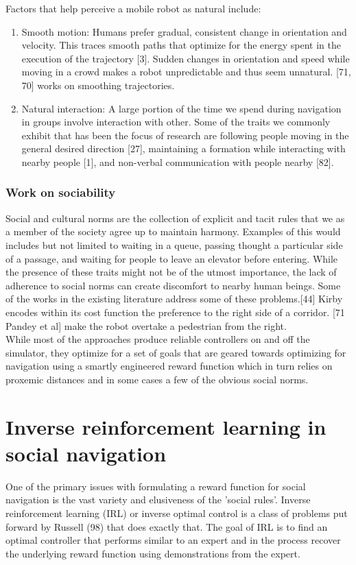 Factors that help perceive a mobile robot as natural include:
\begin{enumerate}
	\item Smooth motion: Humans prefer gradual, consistent change in orientation and velocity. This traces smooth paths that optimize for the energy spent in the execution of the trajectory [3]. Sudden changes in orientation and speed while moving in a crowd makes a robot unpredictable and thus seem unnatural. [71, 70] works on smoothing trajectories.
	\item Natural interaction: A large portion of the time we spend during navigation in groups involve interaction with other. Some of the traits we commonly exhibit that has been the focus of research are following people moving in the general desired direction [27], maintaining a formation while interacting with nearby people [1], and non-verbal communication with people nearby [82]. 
	
\end{enumerate}

\subsubsection{Work on sociability}
Social and cultural norms are the collection of explicit and tacit rules that we as a member of the society agree up to maintain harmony. Examples of this would includes but not limited to waiting in a queue, passing thought a particular side of a passage, and waiting for people to leave an elevator before entering. While the presence of these traits might not be of the utmost importance, the lack of adherence to social norms can create discomfort to nearby human beings. Some of the works in the existing literature address some of these problems.[44] Kirby encodes within its cost function the preference to the right side of a corridor. [71 Pandey et al] make the robot overtake a pedestrian from the right.\\

While most of the approaches produce reliable controllers on and off the simulator, they optimize for a set of goals that are geared towards optimizing for navigation using a smartly engineered reward function which in turn relies on proxemic distances and in some cases a few of the obvious social norms.\\

\section{Inverse reinforcement learning in social navigation}
One of the primary issues with formulating a reward function for social navigation is the vast variety and elusiveness of the 'social rules'. Inverse reinforcement learning (IRL) or inverse optimal control is a class of problems put forward by Russell (98) that does exactly that. The goal of IRL is to find an optimal controller that performs similar to an expert and in the process recover the underlying reward function using demonstrations from the expert. \\

